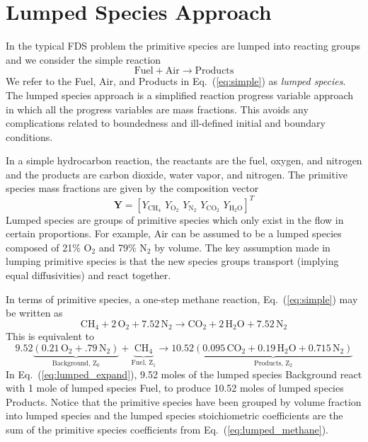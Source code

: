 \section{Lumped Species Approach}
\label{sec:lumpedspecies}

In the typical FDS problem the primitive species are lumped into reacting groups and we consider the simple reaction
\begin{equation}\label{eq:simple}
\mathrm{Fuel + Air \rightarrow Products}
\end{equation}
We refer to the Fuel, Air, and Products in Eq.~(\ref{eq:simple}) as \emph{lumped species}.  The lumped species approach is a simplified reaction progress variable approach \cite{fox2003} in which all the progress variables are mass fractions. This avoids any complications related to boundedness and ill-defined initial and boundary conditions.

In a simple hydrocarbon reaction, the reactants are the fuel, oxygen, and nitrogen and the products are carbon dioxide, water vapor, and nitrogen. The primitive species mass fractions are given by the composition vector
\begin{equation}\label{eq:prim_vector}
\mathbf{Y} = [Y_{\mathrm{CH}_4}\, \, Y_{\mathrm{O}_2}\, \, Y_{\mathrm{N}_2}\, \, Y_{\mathrm{CO}_2}\, \, Y_{\mathrm{H}_2\mathrm{O}}]^T
\end{equation}
Lumped species are groups of primitive species which only exist in the flow in certain proportions. For example, Air can be assumed to be a lumped species composed of 21\% O$_2$ and 79\% N$_2$ by volume. The key assumption made in lumping primitive species is that the new species groups transport (implying equal diffusivities) and react together.

In terms of primitive species, a one-step methane reaction, Eq.~(\ref{eq:simple}) may be written as
\begin{equation}\label{eq:lumped_methane}
\mbox{CH}_4 + 2\, \mbox{O}_2+7.52\,\mbox{N}_2 \rightarrow \mbox{CO}_2+2\,\mbox{H}_2\mbox{O}+7.52\,\mbox{N}_2
\end{equation}
This is equivalent to
\begin{equation}\label{eq:lumped_expand}
\mathrm{9.52\underbrace{(0.21\,\mbox{O}_2+.79\,\mbox{N}_2)}_\text{Background,~$Z_0$}+\underbrace{\mbox{CH}_4}_\text{Fuel,~$Z_1$} \rightarrow 10.52\underbrace{(0.095\,\mbox{CO}_2+0.19\,\mbox{H}_2\mbox{O}+0.715\,\mbox{N}_2)}_\text{Products,~$Z_2$}}
\end{equation}
In Eq.~(\ref{eq:lumped_expand}), 9.52 moles of the lumped species Background react with 1 mole of lumped species Fuel, to produce 10.52 moles of lumped species Products.  Notice that the primitive species have been grouped by volume fraction into lumped species and the lumped species stoichiometric coefficients are the sum of the primitive species coefficients from Eq.~(\ref{eq:lumped_methane}).

